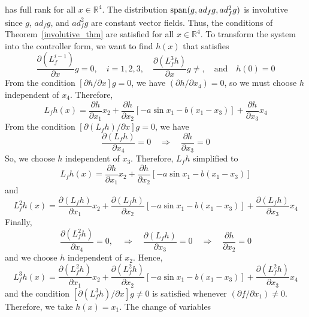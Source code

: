 \documentclass[12pt,a4paper,oneside]{book}
\begin{document}
\begin{onehalfspace}
\begin{example}
\begin{equation*}
	\end{equation*}
	has full rank for all $x\in\mathbb{R}^4$. The distribution $\operatorname{span}(g,ad_fg,ad^2_fg)$ is involutive since $g$, $ad_fg$, and $ad_f^2g$ are constant vector fields. Thus, the conditions of Theorem~\ref{involutive_thm} are satisfied for all $x\in\mathbb{R}^4$. To transform the system into the controller form, we want to find $h(x)$ that satisfies
	\begin{equation*}
		\frac{\partial(L_f^{i-1})}{\partial x}g=0, \quad i=1,2,3,\quad \frac{\partial(L_f^3h)}{\partial x} g\ne, \quad\text{and}\quad h(0)=0
	\end{equation*}
From the condition $[\partial h/\partial x]g=0$, we have $(\partial h/\partial x_4)=0$, so we must choose $h$ independent of $x_4$. Therefore,
\begin{equation*}
	L_fh(x) = \frac{\partial h}{\partial x_1}x_2+\frac{\partial h}{\partial x_2}[-a\sin x_1-b(x_1-x_3)]+\frac{\partial h}{\partial x_3}x_4
\end{equation*}
From the condition $[\partial (L_fh)/\partial x]g=0$, we have
\begin{equation*}
	\frac{\partial(L_fh)}{\partial x_4}=0\quad\Rightarrow\quad\frac{\partial h}{\partial x_3}=0
\end{equation*}
So, we choose $h$ independent of $x_3$. Therefore, $L_fh$ simplified to 
\begin{equation*}
	L_fh(x)=\frac{\partial h}{\partial x_1}x_2+\frac{\partial h}{\partial x_2}[-a\sin x_1-b(x_1-x_3)]
\end{equation*}
and 
\begin{equation*}
	L_f^2h(x)=\frac{\partial(L_fh)}{\partial x_1}x_2+\frac{\partial(L_fh)}{\partial x_2}[-a\sin x_1 - b(x_1-x_3)]+\frac{\partial(L_fh)}{\partial x_3}x_4
\end{equation*}
Finally,
\begin{equation*}
	\frac{\partial(L_f^2h)}{\partial x_4}=0,\quad\Rightarrow\quad\frac{\partial(L_fh)}{\partial x_3}=0\quad\Rightarrow\quad\frac{\partial h}{\partial x_2}=0
\end{equation*}
and we choose $h$ independent of $x_2$. Hence,
\begin{equation*}
	L_f^3h(x)=\frac{\partial(L_f^2h)}{\partial x_1}x_2+\frac{\partial(L_f^2h)}{\partial x_2}[-a\sin x_1-b(x_1-x_3)]+\frac{\partial(L_f^2h)}{\partial x_3}x_4
\end{equation*}
and the condition $[\partial(L_f^3h)/\partial x]g\ne0$ is satisfied whenever $(\partial f/\partial x_1)\ne0$. Therefore, we take $h(x)=x_1$. The change of variables

\end{example}
\end{onehalfspace}
\end{document}
